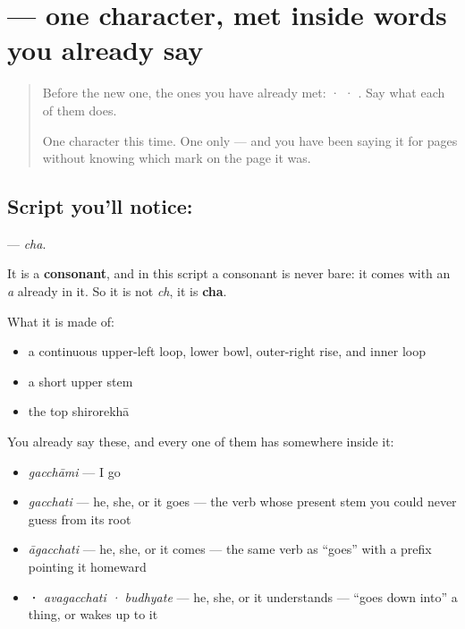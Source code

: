 \section[\texorpdfstring{\sk{छ} (cha)}{छ (cha)}]{ — one character, met inside words you already say}

\label{lesson:SA-S220-letter-cha}



\begin{quote}
Before the new one, the ones you have already met:  ·  · . Say what each of them does.

One character this time. One only — and you have been saying it for pages without knowing which mark on the page it was.
\end{quote}

\subsection*{Script you'll notice: }
\textbf{} — \emph{cha}.

It is a \textbf{consonant}, and in this script a consonant is never bare: it comes with an \emph{a} already in it. So it is not \emph{ch}, it is \textbf{cha}.

What it is made of:

\begin{itemize}
\raggedright
  \item a continuous upper-left loop, lower bowl, outer-right rise, and inner loop
  \item a short upper stem
  \item the top shirorekhā
\end{itemize}

You already say these, and every one of them has  somewhere inside it:

\begin{itemize}
\raggedright
  \item \textbf{} \emph{gacchāmi} — I go
  \item \textbf{} \emph{gacchati} — he, she, or it goes — the verb whose present stem you could never guess from its root
  \item \textbf{} \emph{āgacchati} — he, she, or it comes — the same verb as \textquotedblleft{}goes\textquotedblright{} with a prefix pointing it homeward
  \item \textbf{ · } \emph{avagacchati · budhyate} — he, she, or it understands — \textquotedblleft{}goes down into\textquotedblright{} a thing, or wakes up to it
\end{itemize}

